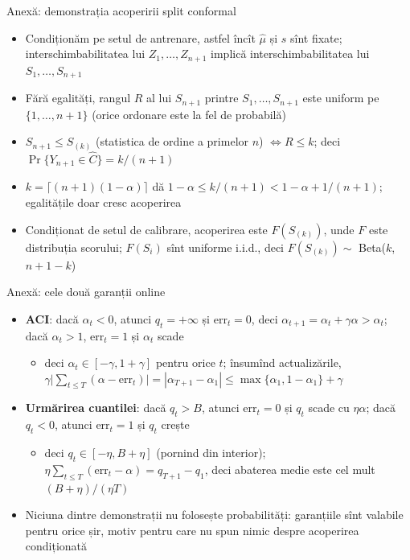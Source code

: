\begin{frame}{Anexă: demonstrația acoperirii split conformal}
\hypertarget{atsapp1}{}
\itemsize{\small}
\begin{itemize}
    \item Condiționăm pe setul de antrenare, astfel încît $\hat\mu$ și $s$ sînt fixate; interschimbabilitatea lui $Z_1, \dots, Z_{n+1}$ implică interschimbabilitatea lui $S_1, \dots, S_{n+1}$
    \item Fără egalități, rangul $R$ al lui $S_{n+1}$ printre $S_1, \dots, S_{n+1}$ este uniform pe $\{1, \dots, n + 1\}$ (orice ordonare este la fel de probabilă)
    \item $S_{n+1} \le S_{(k)}$ (statistica de ordine a primelor $n$) $\iff R \le k$; deci $\Pr\{Y_{n+1} \in \hat C\} = k/(n + 1)$
    \item $k = \lceil (n + 1)(1 - \alpha)\rceil$ dă $1 - \alpha \le k/(n + 1) < 1 - \alpha + 1/(n + 1)$; egalitățile doar cresc acoperirea
    \item Condiționat de setul de calibrare, acoperirea este $F(S_{(k)})$, unde $F$ este distribuția scorului; $F(S_i)$ sînt uniforme i.i.d., deci $F(S_{(k)}) \sim$ Beta($k$, $n + 1 - k$)
\end{itemize}
\end{frame}

\begin{frame}{Anexă: cele două garanții online}
\hypertarget{atsapp2}{}
\itemsize{\small}
\begin{itemize}
    \item \textbf{ACI}: dacă $\alpha_t < 0$, atunci $q_t = +\infty$ și $\mathrm{err}_t = 0$, deci $\alpha_{t+1} = \alpha_t + \gamma\alpha > \alpha_t$; dacă $\alpha_t > 1$, $\mathrm{err}_t = 1$ și $\alpha_t$ scade
    \begin{itemize}
        \item deci $\alpha_t \in [-\gamma, 1 + \gamma]$ pentru orice $t$; însumînd actualizările, $\gamma\big|\sum_{t \le T}(\alpha - \mathrm{err}_t)\big| = |\alpha_{T+1} - \alpha_1| \le \max\{\alpha_1, 1 - \alpha_1\} + \gamma$
    \end{itemize}
    \item \textbf{Urmărirea cuantilei}: dacă $q_t > B$, atunci $\mathrm{err}_t = 0$ și $q_t$ scade cu $\eta\alpha$; dacă $q_t < 0$, atunci $\mathrm{err}_t = 1$ și $q_t$ crește
    \begin{itemize}
        \item deci $q_t \in [-\eta, B + \eta]$ (pornind din interior); $\eta\sum_{t \le T}(\mathrm{err}_t - \alpha) = q_{T+1} - q_1$, deci abaterea medie este cel mult $(B + \eta)/(\eta T)$
    \end{itemize}
    \item Niciuna dintre demonstrații nu folosește probabilități: garanțiile sînt valabile pentru orice șir, motiv pentru care nu spun nimic despre acoperirea condiționată
\end{itemize}
\end{frame}


